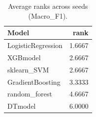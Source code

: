 \begin{table}[t]
\centering
\begin{tabular}{lr}
\toprule
Model & rank \\
\midrule
LogisticRegression & 1.6667 \\
XGBmodel & 2.6667 \\
sklearn_SVM & 2.6667 \\
GradientBoosting & 3.3333 \\
random_forest & 4.6667 \\
DTmodel & 6.0000 \\
\bottomrule
\end{tabular}
\caption{Average ranks across seeds (Macro_F1).}
\label{tab:avg_rank_Macro_F1}
\end{table}